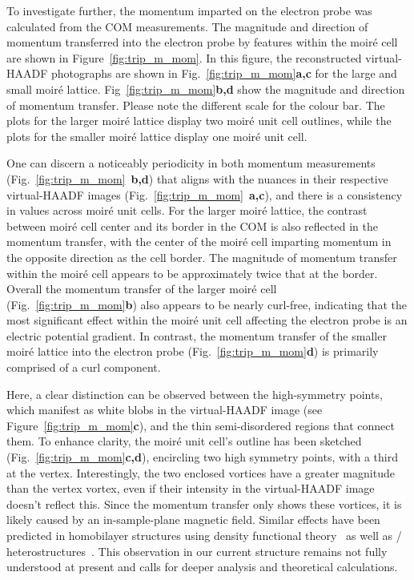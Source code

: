 To investigate further, the momentum imparted on the electron probe was calculated from the COM measurements.
%
The magnitude and direction of momentum transferred into the electron probe by features within the moiré cell are shown in Figure~\ref{fig:trip_m_mom}. In this figure, the reconstructed virtual-HAADF photographs are shown in Fig.~\ref{fig:trip_m_mom}\textbf{a,c} for the large and small moiré lattice. Fig~\ref{fig:trip_m_mom}\textbf{b,d} show the magnitude and direction of momentum transfer. Please note the different scale for the colour bar. The plots for the larger moiré lattice display two moiré unit cell outlines, while the plots for the smaller moiré lattice display one moiré unit cell.



One can discern a noticeably periodicity in both momentum measurements (Fig.~\ref{fig:trip_m_mom}~\textbf{b,d}) that aligns with the nuances in their respective virtual-HAADF images (Fig.~\ref{fig:trip_m_mom}~\textbf{a,c}), and there is a consistency in values across moiré unit cells. 
%
For the larger moiré lattice, the contrast between moiré cell center and its border in the COM is also reflected in the momentum transfer, with the center of the moiré cell imparting momentum in the opposite direction as the cell border. The magnitude of momentum transfer within the moiré cell appears to be approximately twice that at the border.
%
Overall the momentum transfer of the larger moiré cell (Fig.~\ref{fig:trip_m_mom}\textbf{b}) also appears to be nearly curl-free, indicating that the most significant effect within the moiré unit cell affecting the electron probe is an electric potential gradient.
%
In contrast, the momentum transfer of the smaller moiré lattice into the electron probe (Fig.~\ref{fig:trip_m_mom}\textbf{d}) is primarily comprised of a curl component.

Here, a clear distinction can be observed between the high-symmetry points, which manifest as white blobs in the virtual-HAADF image (see Figure~\ref{fig:trip_m_mom}\textbf{c}), and the thin semi-disordered regions that connect them.
%
To enhance clarity, the moiré unit cell's outline has been sketched (Fig.~\ref{fig:trip_m_mom}\textbf{c,d}), encircling two high symmetry points, with a third at the vertex. 
%
Interestingly, the two enclosed vortices have a greater magnitude than the vertex vortex, even if their intensity in the virtual-HAADF image doesn't reflect this. 
%
Since the momentum transfer only shows these vortices, it is likely caused by an in-sample-plane magnetic field.
%
Similar effects have been predicted in homobilayer  structures using density functional theory~\cite{wuTopologicalInsulatorsTwisted2019} as well as /~ heterostructures~\cite{zhangSpintexturedChernBands2021}.
%
This observation in our current  structure remains not fully understood at present and calls for deeper analysis and theoretical calculations.

